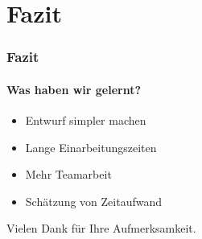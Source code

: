 \documentclass[t]{beamer}
\begin{document}
\section{Fazit}
\begin{frame}
	\frametitle{Fazit}
	\framesubtitle{Was haben wir gelernt?}
	\begin{itemize}
	\item <+-> Entwurf simpler machen
	\item <+-> Lange Einarbeitungszeiten
	\item <+-> Mehr Teamarbeit
	\item <+-> Schätzung von Zeitaufwand
	\end{itemize}
\end{frame}
\begin{frame}[c]
	Vielen Dank für Ihre Aufmerksamkeit.
\end{frame}
\end{document}
